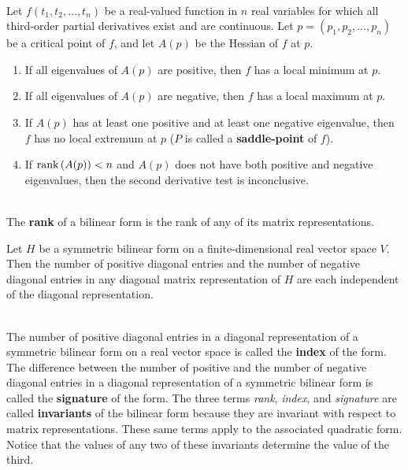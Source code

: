 \begin{theorem}
	\hfill\\
	Let $f(t_1, t_2, \dots, t_n)$ be a real-valued function in $n$ real variables for which all third-order partial derivatives exist and are continuous. Let $p = (p_1, p_2, \dots, p_n)$ be a critical point of $f$, and let $A(p)$ be the Hessian of $f$ at $p$.

	\begin{enumerate}
		\item If all eigenvalues of $A(p)$ are positive, then $f$ has a local minimum at $p$.
		\item If all eigenvalues of $A(p)$ are negative, then $f$ has a local maximum at $p$.
		\item If $A(p)$ has at least one positive and at least one negative eigenvalue, then $f$ has no local extremum at $p$ ($P$ is called a \textbf{saddle-point} of $f$).
		\item If $\text{rank}\left(A(p)\right) < n$ and $A(p)$ does not have both positive and negative eigenvalues, then the second derivative test is inconclusive.
	\end{enumerate}
\end{theorem}

\begin{definition}
	\hfill\\
	The \textbf{rank} of a bilinear form is the rank of any of its matrix representations.
\end{definition}

\begin{theorem}
	Let $H$ be a symmetric bilinear form on a finite-dimensional real vector space $V$. Then the number of positive diagonal entries and the number of negative diagonal entries in any diagonal matrix representation of $H$ are each independent of the diagonal representation.
\end{theorem}

\begin{definition}
	\hfill\\
	The number of positive diagonal entries in a diagonal representation of a symmetric bilinear form on a real vector space is called the \textbf{index} of the form. The difference between the number of positive and the number of negative diagonal entries in a diagonal representation of a symmetric bilinear form is called the \textbf{signature} of the form. The three terms \textit{rank}, \textit{index}, and \textit{signature} are called \textbf{invariants} of the bilinear form because they are invariant with respect to matrix representations. These same terms apply to the associated quadratic form. Notice that the values of any two of these invariants determine the value of the third.
\end{definition}

